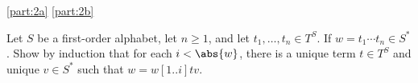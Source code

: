 \documentclass[boxes,pages,color=CornflowerBlue]{homework}
\begin{document}
\begin{solution}
    \ref{part:2a}
    \ref{part:2b}
\end{solution}

\begin{problem}
Let $S$ be a first-order alphabet, let $n\ge 1$, and let $t_1, \ldots,t_n \in T^S$.
If $w = t_1 \cdots t_n \in S^*$.
Show by induction that for each $i < \abs{w}$, there is a unique term $t \in T^S$ and unique $v \in S^*$ such that $w = w[1..i] t v$.
\end{problem}

\begin{solution}

\end{solution}
\end{document}
